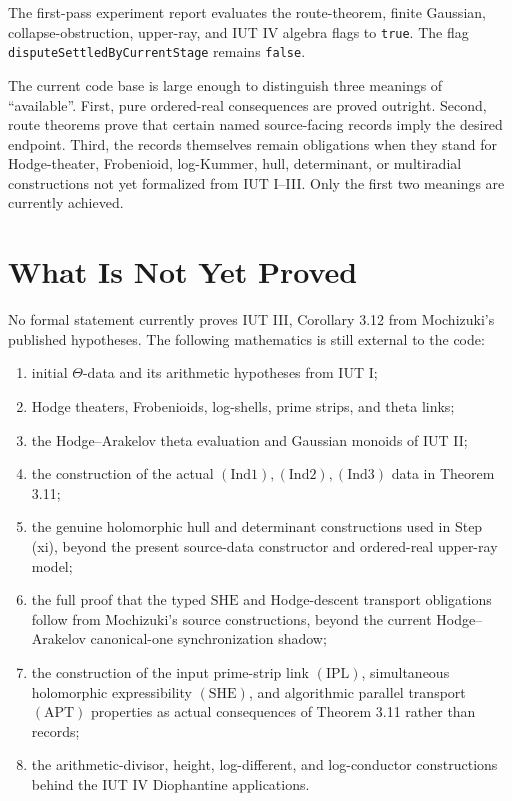 \documentclass[11pt]{article}
\newcommand{\IUT}{IUT}
\newcommand{\Ind}{\ensuremath{\mathrm{Ind}}}
\newcommand{\SHE}{\ensuremath{\mathrm{SHE}}}
\newcommand{\IPL}{\ensuremath{\mathrm{IPL}}}
\newcommand{\APT}{\ensuremath{\mathrm{APT}}}
\theoremstyle{plain}
\theoremstyle{definition}
\theoremstyle{remark}
\begin{document}
The first-pass experiment report evaluates the route-theorem, finite Gaussian,
collapse-obstruction, upper-ray, and \IUT{} IV algebra flags to
\texttt{true}.  The flag \texttt{disputeSettledByCurrentStage} remains
\texttt{false}.

The current code base is large enough to distinguish three meanings of
``available''.  First, pure ordered-real consequences are proved outright.
Second, route theorems prove that certain named source-facing records imply the
desired endpoint.  Third, the records themselves remain obligations when they
stand for Hodge-theater, Frobenioid, log-Kummer, hull, determinant, or
multiradial constructions not yet formalized from \IUT{} I--III.  Only the first
two meanings are currently achieved.

\section{What Is Not Yet Proved}

No formal statement currently proves \IUT{} III, Corollary 3.12 from
Mochizuki's published hypotheses.  The following mathematics is still external
to the code:

\begin{enumerate}
\item initial \(\Theta\)-data and its arithmetic hypotheses from \IUT{} I;
\item Hodge theaters, Frobenioids, log-shells, prime strips, and theta links;
\item the Hodge--Arakelov theta evaluation and Gaussian monoids of \IUT{} II;
\item the construction of the actual \((\Ind1),(\Ind2),(\Ind3)\) data in
  Theorem 3.11;
\item the genuine holomorphic hull and determinant constructions used in
  Step (xi), beyond the present source-data constructor and ordered-real
  upper-ray model;
\item the full proof that the typed \SHE{} and Hodge-descent transport
  obligations follow from Mochizuki's source constructions, beyond the current
  Hodge--Arakelov canonical-one synchronization shadow;
\item the construction of the input prime-strip link \((\IPL)\), simultaneous
  holomorphic expressibility \((\SHE)\), and algorithmic parallel transport
  \((\APT)\) properties as actual consequences of Theorem 3.11 rather than
  records;
\item the arithmetic-divisor, height, log-different, and log-conductor
  constructions behind the \IUT{} IV Diophantine applications.
\end{enumerate}
\end{document}
